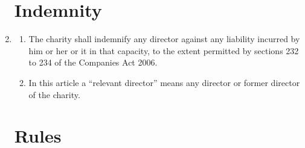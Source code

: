 \begin{enumerate}
\section{Indemnity}

\item \label{cls:directors-indemnity}
  \begin{enumerate}
  \item
    The charity shall indemnify any director against any
    liability incurred by him or her or it in that capacity, to the
    extent permitted by sections 232 to 234 of the Companies Act 2006.
  \item
    In this article a ``relevant director'' means any director or
    former director of the charity.
  \end{enumerate}

\section{Rules}


\end{enumerate}
